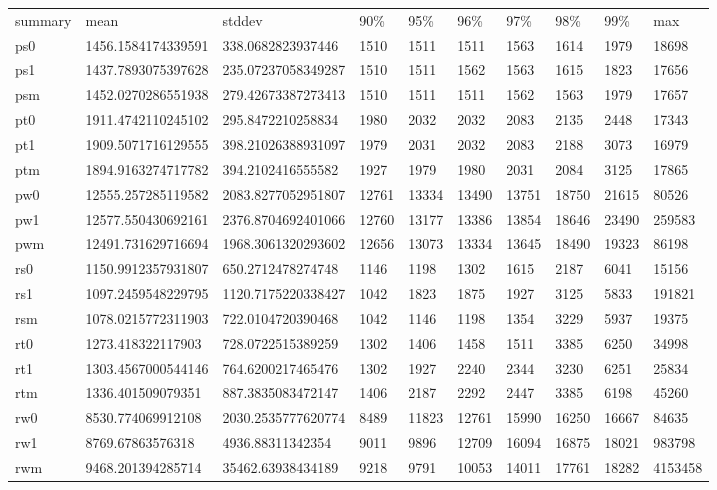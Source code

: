 \begin{tabular}{llllllllll}
\toprule
 summary &                mean &              stddev &    90\% &    95\% &    96\% &    97\% &    98\% &    99\% &      max \\
     ps0 &  1456.1584174339591 &   338.0682823937446 &   1510 &   1511 &   1511 &   1563 &   1614 &   1979 &    18698 \\
     ps1 &  1437.7893075397628 &  235.07237058349287 &   1510 &   1511 &   1562 &   1563 &   1615 &   1823 &    17656 \\
     psm &  1452.0270286551938 &  279.42673387273413 &   1510 &   1511 &   1511 &   1562 &   1563 &   1979 &    17657 \\
     pt0 &  1911.4742110245102 &   295.8472210258834 &   1980 &   2032 &   2032 &   2083 &   2135 &   2448 &    17343 \\
     pt1 &  1909.5071716129555 &  398.21026388931097 &   1979 &   2031 &   2032 &   2083 &   2188 &   3073 &    16979 \\
     ptm &  1894.9163274717782 &   394.2102416555582 &   1927 &   1979 &   1980 &   2031 &   2084 &   3125 &    17865 \\
     pw0 &  12555.257285119582 &  2083.8277052951807 &  12761 &  13334 &  13490 &  13751 &  18750 &  21615 &    80526 \\
     pw1 &  12577.550430692161 &  2376.8704692401066 &  12760 &  13177 &  13386 &  13854 &  18646 &  23490 &   259583 \\
     pwm &  12491.731629716694 &  1968.3061320293602 &  12656 &  13073 &  13334 &  13645 &  18490 &  19323 &    86198 \\
     rs0 &  1150.9912357931807 &   650.2712478274748 &   1146 &   1198 &   1302 &   1615 &   2187 &   6041 &    15156 \\
     rs1 &  1097.2459548229795 &  1120.7175220338427 &   1042 &   1823 &   1875 &   1927 &   3125 &   5833 &   191821 \\
     rsm &  1078.0215772311903 &   722.0104720390468 &   1042 &   1146 &   1198 &   1354 &   3229 &   5937 &    19375 \\
     rt0 &   1273.418322117903 &   728.0722515389259 &   1302 &   1406 &   1458 &   1511 &   3385 &   6250 &    34998 \\
     rt1 &  1303.4567000544146 &   764.6200217465476 &   1302 &   1927 &   2240 &   2344 &   3230 &   6251 &    25834 \\
     rtm &   1336.401509079351 &   887.3835083472147 &   1406 &   2187 &   2292 &   2447 &   3385 &   6198 &    45260 \\
     rw0 &   8530.774069912108 &  2030.2535777620774 &   8489 &  11823 &  12761 &  15990 &  16250 &  16667 &    84635 \\
     rw1 &    8769.67863576318 &    4936.88311342354 &   9011 &   9896 &  12709 &  16094 &  16875 &  18021 &   983798 \\
     rwm &   9468.201394285714 &   35462.63938434189 &   9218 &   9791 &  10053 &  14011 &  17761 &  18282 &  4153458 \\
\bottomrule
\end{tabular}
